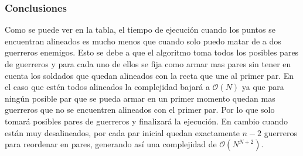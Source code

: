 		\subsubsection*{Conclusiones}\;
			Como se puede ver en la tabla, el tiempo de ejecución cuando los puntos se encuentran alineados es mucho menos que cuando solo puedo matar de a dos guerreros enemigos. Esto se debe a que el algoritmo toma todos los posibles pares de guerreros y para cada uno de ellos se fija como armar mas pares sin tener en cuenta los soldados que quedan alineados con la recta que une al primer par. En el caso que estén todos alineados la complejidad bajará a $\mathcal{O}(N)$ ya que para ningún posible par que se pueda armar en un primer momento quedan mas guerreros que no se encuentren alineados con el primer par. Por lo que solo tomará posibles pares de guerreros y finalizará la ejecución. En cambio cuando están muy desalineados, por cada par inicial quedan exactamente $n - 2$ guerreros para reordenar en pares, generando así una complejidad de $\mathcal{O}(N^{N+2})$.


